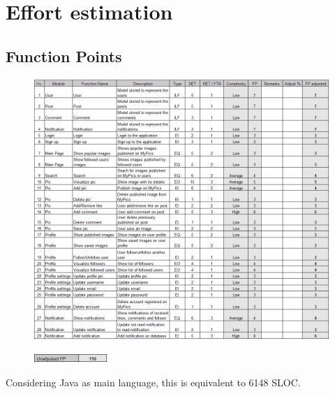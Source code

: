 \documentclass[11pt, a4paper]{article}
\begin{document}
\newpage

\section{Effort estimation}

\subsection{Function Points} 
\begin{figure}[H]
    \centering
    \includegraphics[width=1\textwidth]{images/FP.png}
\end{figure}
\begin{figure}[H]
    \includegraphics[width=0.25\textwidth]{images/UFP.png}
\end{figure}

\noindent
Considering Java as main language, this is equivalent to 6148 SLOC.

\newpage
\end{document}

